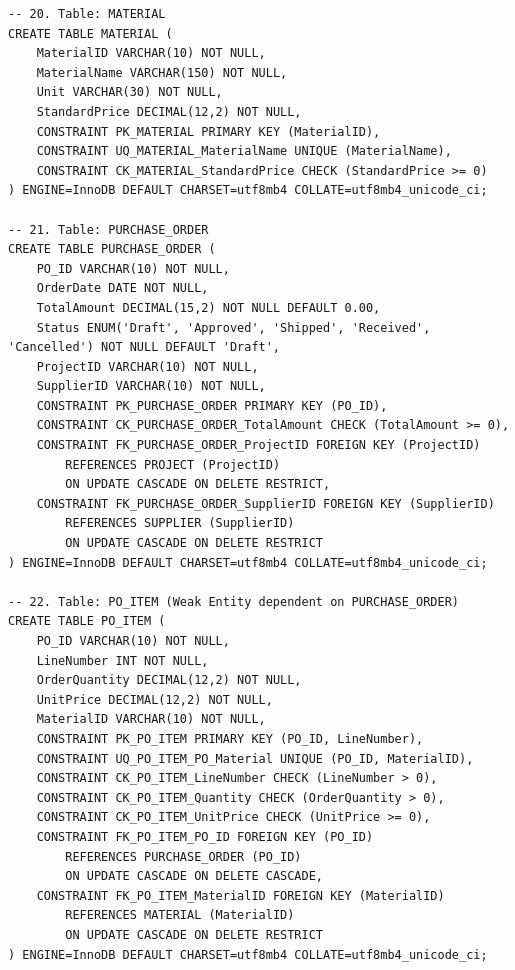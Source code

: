 \documentclass[a4paper,12pt]{report}
\begin{document}
\begin{lstlisting}
-- 20. Table: MATERIAL
CREATE TABLE MATERIAL (
    MaterialID VARCHAR(10) NOT NULL,
    MaterialName VARCHAR(150) NOT NULL,
    Unit VARCHAR(30) NOT NULL,
    StandardPrice DECIMAL(12,2) NOT NULL,
    CONSTRAINT PK_MATERIAL PRIMARY KEY (MaterialID),
    CONSTRAINT UQ_MATERIAL_MaterialName UNIQUE (MaterialName),
    CONSTRAINT CK_MATERIAL_StandardPrice CHECK (StandardPrice >= 0)
) ENGINE=InnoDB DEFAULT CHARSET=utf8mb4 COLLATE=utf8mb4_unicode_ci;

-- 21. Table: PURCHASE_ORDER
CREATE TABLE PURCHASE_ORDER (
    PO_ID VARCHAR(10) NOT NULL,
    OrderDate DATE NOT NULL,
    TotalAmount DECIMAL(15,2) NOT NULL DEFAULT 0.00,
    Status ENUM('Draft', 'Approved', 'Shipped', 'Received', 'Cancelled') NOT NULL DEFAULT 'Draft',
    ProjectID VARCHAR(10) NOT NULL,
    SupplierID VARCHAR(10) NOT NULL,
    CONSTRAINT PK_PURCHASE_ORDER PRIMARY KEY (PO_ID),
    CONSTRAINT CK_PURCHASE_ORDER_TotalAmount CHECK (TotalAmount >= 0),
    CONSTRAINT FK_PURCHASE_ORDER_ProjectID FOREIGN KEY (ProjectID)
        REFERENCES PROJECT (ProjectID)
        ON UPDATE CASCADE ON DELETE RESTRICT,
    CONSTRAINT FK_PURCHASE_ORDER_SupplierID FOREIGN KEY (SupplierID)
        REFERENCES SUPPLIER (SupplierID)
        ON UPDATE CASCADE ON DELETE RESTRICT
) ENGINE=InnoDB DEFAULT CHARSET=utf8mb4 COLLATE=utf8mb4_unicode_ci;

-- 22. Table: PO_ITEM (Weak Entity dependent on PURCHASE_ORDER)
CREATE TABLE PO_ITEM (
    PO_ID VARCHAR(10) NOT NULL,
    LineNumber INT NOT NULL,
    OrderQuantity DECIMAL(12,2) NOT NULL,
    UnitPrice DECIMAL(12,2) NOT NULL,
    MaterialID VARCHAR(10) NOT NULL,
    CONSTRAINT PK_PO_ITEM PRIMARY KEY (PO_ID, LineNumber),
    CONSTRAINT UQ_PO_ITEM_PO_Material UNIQUE (PO_ID, MaterialID),
    CONSTRAINT CK_PO_ITEM_LineNumber CHECK (LineNumber > 0),
    CONSTRAINT CK_PO_ITEM_Quantity CHECK (OrderQuantity > 0),
    CONSTRAINT CK_PO_ITEM_UnitPrice CHECK (UnitPrice >= 0),
    CONSTRAINT FK_PO_ITEM_PO_ID FOREIGN KEY (PO_ID)
        REFERENCES PURCHASE_ORDER (PO_ID)
        ON UPDATE CASCADE ON DELETE CASCADE,
    CONSTRAINT FK_PO_ITEM_MaterialID FOREIGN KEY (MaterialID)
        REFERENCES MATERIAL (MaterialID)
        ON UPDATE CASCADE ON DELETE RESTRICT
) ENGINE=InnoDB DEFAULT CHARSET=utf8mb4 COLLATE=utf8mb4_unicode_ci;


\end{lstlisting}
\end{document}
